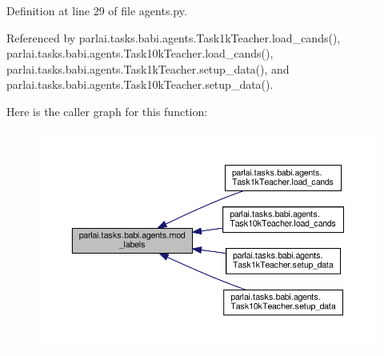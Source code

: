Definition at line 29 of file agents.\+py.



Referenced by parlai.\+tasks.\+babi.\+agents.\+Task1k\+Teacher.\+load\+\_\+cands(), parlai.\+tasks.\+babi.\+agents.\+Task10k\+Teacher.\+load\+\_\+cands(), parlai.\+tasks.\+babi.\+agents.\+Task1k\+Teacher.\+setup\+\_\+data(), and parlai.\+tasks.\+babi.\+agents.\+Task10k\+Teacher.\+setup\+\_\+data().

Here is the caller graph for this function\+:
\nopagebreak
\begin{figure}[H]
\begin{center}
\leavevmode
\includegraphics[width=350pt]{namespaceparlai_1_1tasks_1_1babi_1_1agents_a80ee701751bc608fcb01bcfb1e884de0_icgraph}
\end{center}
\end{figure}
